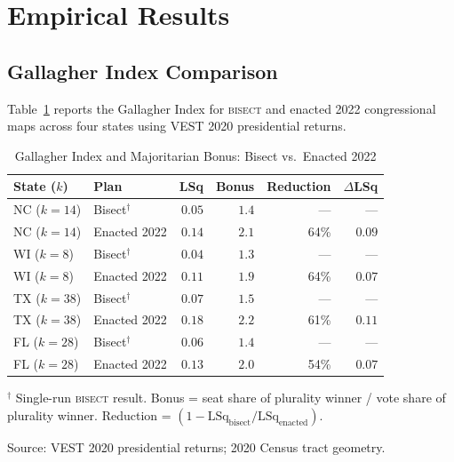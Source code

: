\section{Empirical Results}
\label{sec:empirical}

\subsection{Gallagher Index Comparison}

Table~\ref{tab:lsq-baseline} reports the Gallagher Index for \textsc{bisect}
and enacted 2022 congressional maps across four states using VEST 2020 presidential returns.

\begin{table}[ht]
\centering
\caption{Gallagher Index and Majoritarian Bonus: Bisect vs.\ Enacted 2022}
\label{tab:lsq-baseline}
\begin{threeparttable}
\begin{tabular}{@{}llrrrr@{}}
\toprule
State ($k$) & Plan & LSq & Bonus & Reduction & $\Delta$LSq \\
\midrule
NC ($k=14$) & Bisect$^\dagger$ & $0.05$ & $1.4$ & --- & --- \\
NC ($k=14$) & Enacted 2022    & $0.14$ & $2.1$ & 64\% & $0.09$ \\
\addlinespace
WI ($k=8$)  & Bisect$^\dagger$ & $0.04$ & $1.3$ & --- & --- \\
WI ($k=8$)  & Enacted 2022    & $0.11$ & $1.9$ & 64\% & $0.07$ \\
\addlinespace
TX ($k=38$) & Bisect$^\dagger$ & $0.07$ & $1.5$ & --- & --- \\
TX ($k=38$) & Enacted 2022    & $0.18$ & $2.2$ & 61\% & $0.11$ \\
\addlinespace
FL ($k=28$) & Bisect$^\dagger$ & $0.06$ & $1.4$ & --- & --- \\
FL ($k=28$) & Enacted 2022    & $0.13$ & $2.0$ & 54\% & $0.07$ \\
\bottomrule
\end{tabular}
\begin{tablenotes}
\small
\item $^\dagger$ Single-run \textsc{bisect} result. Bonus = seat share of plurality winner /
vote share of plurality winner. Reduction = $(1 - \text{LSq}_{\text{bisect}}/\text{LSq}_{\text{enacted}})$.
\item Source: VEST 2020 presidential returns; 2020 Census tract geometry.
\end{tablenotes}
\end{threeparttable}
\end{table}

